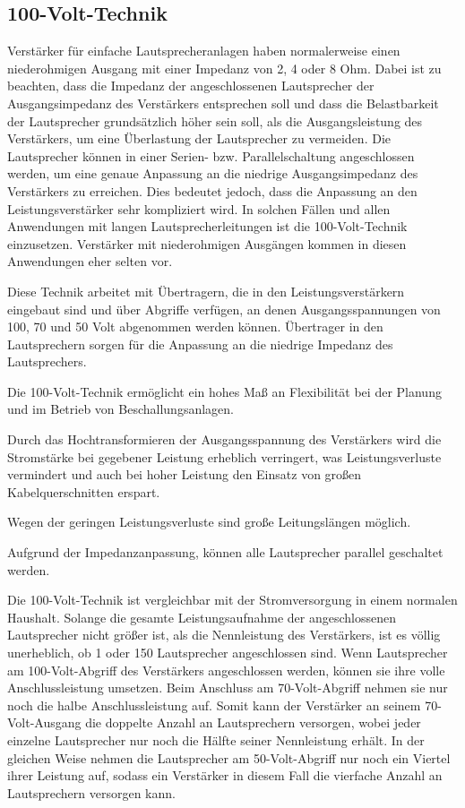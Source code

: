 \subsection{100-Volt-Technik}
\label{sub:100-Volt-Technik}
Verstärker für einfache Lautsprecheranlagen haben normalerweise einen niederohmigen Ausgang mit einer Impedanz von 2, 4 oder 8 Ohm. Dabei ist zu beachten, dass die Impedanz der angeschlossenen Lautsprecher der Ausgangsimpedanz des Verstärkers entsprechen soll und dass die Belastbarkeit der Lautsprecher grundsätzlich höher sein soll, als die Ausgangsleistung des Verstärkers, um eine Überlastung der Lautsprecher zu vermeiden.
Die Lautsprecher können in einer Serien- bzw. Parallelschaltung angeschlossen werden, um eine genaue Anpassung an die niedrige Ausgangsimpedanz des Verstärkers zu erreichen. Dies bedeutet jedoch, dass die Anpassung an den Leistungsverstärker sehr kompliziert wird. In solchen Fällen und allen Anwendungen mit langen Lautsprecherleitungen ist die 100-Volt-Technik einzusetzen. Verstärker mit niederohmigen Ausgängen kommen in diesen Anwendungen eher selten vor.

Diese Technik arbeitet mit Übertragern, die in den Leistungsverstärkern eingebaut sind und über Abgriffe verfügen, an denen Ausgangsspannungen von 100, 70 und 50 Volt abgenommen werden können. Übertrager in den Lautsprechern sorgen für die Anpassung an die niedrige Impedanz des Lautsprechers.

Die 100-Volt-Technik ermöglicht ein hohes Maß an Flexibilität bei der Planung und im Betrieb von Beschallungsanlagen.
\begin{compactenum}
\item Durch das Hochtransformieren der Ausgangsspannung des Verstärkers wird die Stromstärke bei gegebener Leistung erheblich verringert, was Leistungsverluste vermindert und auch bei hoher Leistung den Einsatz von großen Kabelquerschnitten erspart.
\item Wegen der geringen Leistungsverluste sind große Leitungslängen möglich.
\item Aufgrund der Impedanzanpassung, können alle Lautsprecher parallel geschaltet werden.
\end{compactenum}

Die 100-Volt-Technik ist vergleichbar mit der Stromversorgung in einem normalen Haushalt. Solange die gesamte Leistungsaufnahme der angeschlossenen Lautsprecher nicht größer ist, als die Nennleistung des Verstärkers, ist es völlig unerheblich, ob 1 oder 150 Lautsprecher angeschlossen sind. Wenn Lautsprecher am 100-Volt-Abgriff des Verstärkers angeschlossen werden, können sie ihre volle Anschlussleistung umsetzen. Beim Anschluss am 70-Volt-Abgriff nehmen sie nur noch die halbe Anschlussleistung auf. Somit kann der Verstärker an seinem 70-Volt-Ausgang die doppelte Anzahl an Lautsprechern versorgen, wobei jeder einzelne Lautsprecher nur noch die Hälfte seiner Nennleistung erhält. In der gleichen Weise nehmen die Lautsprecher am 50-Volt-Abgriff nur noch ein Viertel ihrer Leistung auf, sodass ein Verstärker in diesem Fall die vierfache Anzahl an Lautsprechern versorgen kann.

